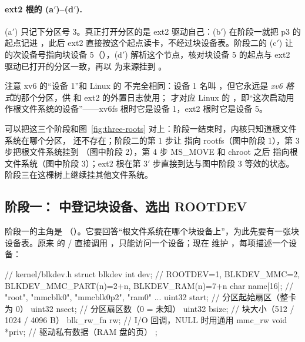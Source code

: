 \paragraph{ext2 根的 (a$'$)--(d$'$).} (a$'$) 只记下分区号 3。真正打开分区的是 ext2 驱动自己：(b$'$)  在阶段一就把 p3 的起点记进 ，此后 ext2 直接按这个起点读卡，不经过块设备表。阶段二的 (c$'$) 让  的次设备号指向块设备 5（），(d$'$)  解析这个节点，核对块设备 5 的起点与 ext2 驱动已打开的分区一致，再以  为来源挂到 \code{/}。

注意 xv6 的“设备 1”和 Linux 的  不完全相同：设备 1 名叫 ，但它永远是 \emph{xv6 格式}的那个分区，供  和 ext2 的外置日志使用； 才对应 Linux 的 ，即“这次启动用作根文件系统的设备”——xv6fs 根时它是设备 1，ext2 根时它是设备 5。

可以把这三个阶段和图~\ref{fig:three-roots} 对上：阶段一结束时，内核只知道根文件系统在哪个分区，\code{/} 还不存在；阶段二的第 1 步让 \code{/} 指向 rootfs（图中阶段 1），第 3 步把根文件系统挂到 （图中阶段 2），第 4 步 MS\_MOVE 和 chroot 之后 \code{/} 指向根文件系统（图中阶段 3）；ext2 根在第 3$'$ 步直接到达与图中阶段 3 等效的状态。阶段三在这棵树上继续挂其他文件系统。

\subsection{阶段一： 中登记块设备、选出 ROOTDEV}
\label{sec:ns-stage1}

阶段一的主角是 （）。它要回答“根文件系统在哪个块设备上”，为此先要有一张块设备表。原来  的 / 直接调用 ，只能访问一个设备；现在  维护 ，每项描述一个设备：

\begin{ccode}
// kernel/blkdev.h
struct blkdev {
  int      dev;      // ROOTDEV=1, BLKDEV_MMC=2, BLKDEV_MMC_PART(n)=2+n, BLKDEV_RAM(n)=7+n
  char     name[16]; // "root", "mmcblk0", "mmcblk0p2", "ram0" ...
  uint32   start;    // 分区起始扇区（整卡为 0）
  uint32   nsect;    // 分区扇区数（0 = 未知）
  uint32   bsize;    // 块大小（512 / 1024 / 4096 B）
  blk_rw_fn rw;      // I/O 回调，NULL 时用通用 mmc_rw
  void     *priv;    // 驱动私有数据（RAM 盘的页）
};
\end{ccode}

